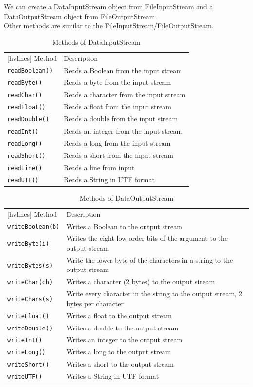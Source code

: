 \documentclass{article}
\begin{document}
We can create a DataInputStream object from FileInputStream and a DataOutputStream object from FileOutputStream.\\
Other methods are similar to the FileInputStream/FileOutputStream.

\begin{table}[h!]
	\centering
	\begin{NiceTabular}{||ll||}[hvlines]
		\RowStyle{\bfseries}Method & Description\\
		\texttt{readBoolean()} & Reads a Boolean from the input stream\\
		\texttt{readByte()} & Reads a byte from the input stream\\
		\texttt{readChar()} & Reads a character from the input stream\\
		\texttt{readFloat()} & Reads a float from the input stream\\
		\texttt{readDouble()} & Reads a double from the input stream\\
		\texttt{readInt()} & Reads an integer from the input stream\\
		\texttt{readLong()} & Reads a long from the input stream\\
		\texttt{readShort()} & Reads a short from the input stream\\
		\texttt{readLine()} & Reads a line from input\\
		\texttt{readUTF()} & Reads a String in UTF format
	\end{NiceTabular}
	\caption{Methods of DataInputStream}
\end{table}

\begin{table}[h!]
	\centering
	\begin{NiceTabular}{||ll||}[hvlines]
		\RowStyle{\bfseries}Method & Description\\
		\texttt{writeBoolean(b)} & Writes a Boolean to the output stream\\
		\texttt{writeByte(i)} & Writes the eight low-order bits of the argument to the output stream\\
		\texttt{writeBytes(s)} & Write the lower byte of the characters in a string to the output stream\\
		\texttt{writeChar(ch)} & Writes a character (2 bytes) to the output stream\\
		\texttt{writeChars(s)} & Write every character in the string to the output stream, 2 bytes per character\\
		\texttt{writeFloat()} & Writes a float to the output stream\\
		\texttt{writeDouble()} & Writes a double to the output stream\\
		\texttt{writeInt()} & Writes an integer to the output stream\\
		\texttt{writeLong()} & Writes a long to the output stream\\
		\texttt{writeShort()} & Writes a short to the output stream\\
		\texttt{writeUTF()} & Writes a String in UTF format
	\end{NiceTabular}
	\caption{Methods of DataOutputStream}
\end{table}
\end{document}
